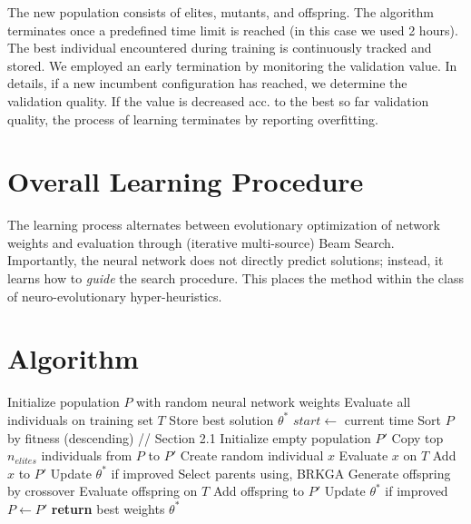 \documentclass[11pt,a4paper]{article}
\begin{document}
The new population consists of elites, mutants, and offspring. The algorithm terminates once a predefined time limit is reached (in this case we used 2 hours). The best individual encountered during training is continuously tracked and stored. We employed an early termination by monitoring the validation value. In details, if a new  incumbent configuration has reached, we determine the validation quality. If the value is decreased acc. to the best so far validation quality, the process of learning terminates by reporting overfitting. 

\section{Overall Learning Procedure}

The learning process alternates between evolutionary optimization of network weights and evaluation through (iterative multi-source) Beam Search. Importantly, the neural network does not directly predict solutions; instead, it learns how to \textit{guide} the search procedure. This places the method within the class of neuro-evolutionary hyper-heuristics.

\section{Algorithm}

\begin{algorithm}[H]
\caption{GA-Based Learning of a Beam Search Heuristic (BRKGA)}
\begin{algorithmic}[1]
\STATE Initialize population $P$ with random neural network weights
\STATE Evaluate all individuals on training set $T$
\STATE Store best solution $\theta^\ast$
\STATE $start \leftarrow$ current time
    \STATE Sort $P$ by fitness (descending) // {Section 2.1}
    \STATE Initialize empty population $P'$
    \STATE Copy top $n_{elites}$ individuals from $P$ to $P'$
        \STATE Create random individual $x$
        \STATE Evaluate $x$ on $T$
        \STATE Add $x$ to $P'$
        \STATE Update $\theta^\ast$ if improved
    \ENDFOR
        \STATE Select parents using, BRKGA
        \STATE Generate offspring by crossover
        \STATE Evaluate offspring on $T$
        \STATE Add offspring to $P'$
        \STATE Update $\theta^\ast$ if improved
    \ENDFOR
    \STATE $P \leftarrow P'$
\ENDWHILE
\STATE \textbf{return} best weights $\theta^\ast$
\end{algorithmic}
\end{algorithm}
\end{document}
